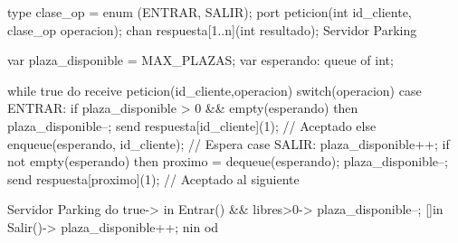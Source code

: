 type clase_op = enum (ENTRAR, SALIR);
port peticion(int id_cliente, clase_op operacion);
chan respuesta[1..n](int resultado);
Servidor Parking{
    var plaza_disponible = MAX_PLAZAS;
    var esperando: queue of int;

    while true do
        receive peticion(id_cliente,operacion)
            switch(operacion)
                case ENTRAR:
                    if plaza_disponible > 0 && empty(esperando) then
                        plaza_disponible--;
                        send respuesta[id_cliente](1); // Aceptado
                    else
                        enqueue(esperando, id_cliente); // Espera
                case SALIR:
                    plaza_disponible++;
                    if not empty(esperando) then
                        proximo = dequeue(esperando);
                        plaza_disponible--;
                        send respuesta[proximo](1); // Aceptado al siguiente
    
}

Servidor Parking{
    do true->
        in Entrar() && libres>0->
            plaza_disponible--;
        []in Salir()->
            plaza_disponible++;
        nin
    od
}